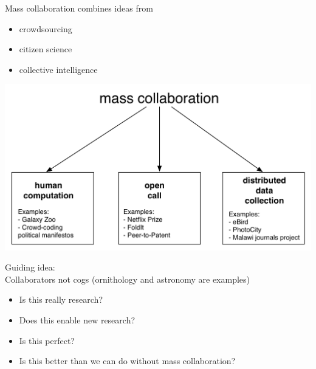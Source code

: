\documentclass[aspectratio=169]{beamer}
\begin{document}
\begin{frame}

Mass collaboration combines ideas from 
\begin{itemize}
\item crowdsourcing
\item citizen science
\item collective intelligence
\end{itemize}

\end{frame}
\begin{frame}

\begin{center}
\includegraphics[width=\textwidth]{figures/mass_collaboration_schematic}
\end{center}

\end{frame}
\begin{frame}

Guiding idea:\\
Collaborators not cogs (ornithology and astronomy are examples)

\end{frame}
\begin{frame}

\begin{itemize}
\item Is this really research?
\pause 
\item Does this enable new research?
\end{itemize}

\end{frame}
\begin{frame}

\begin{itemize}
\item Is this perfect?
\pause
\item Is this better than we can do without mass collaboration?
\end{itemize}

\end{frame}
\end{document}
